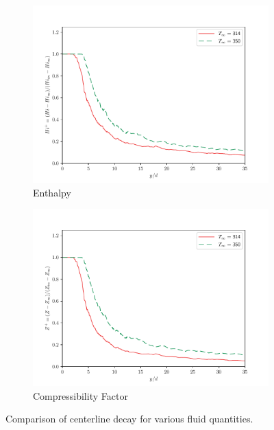 \begin{figure}[H]
\begin{center}
\begin{subfigure}{0.45\textwidth}
	\includegraphics[scale=.45]{figures/Plots/centerline/Hi_centerline_scaled.pdf}
	\caption{Enthalpy} \label{noniso_Hi_centerline_1}
\end{subfigure}
\begin{subfigure}{0.45\textwidth}
	\includegraphics[scale=.45]{figures/Plots/centerline/Z_centerline_scaled.pdf}
	\caption{Compressibility Factor} \label{noniso_Z_centerline_1}
\end{subfigure}

\caption{Comparison of centerline decay for various fluid quantities.}
\label{noniso_centerline_features}
\end{center}
\end{figure}

